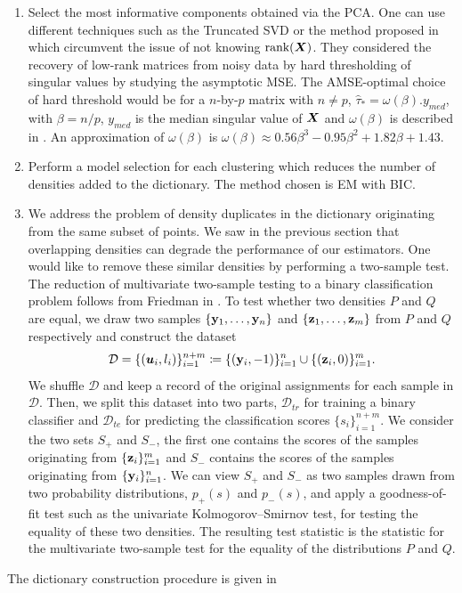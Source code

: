 \begin{enumerate}
  \item Select the most informative components obtained via the PCA. One can use different techniques such as the Truncated SVD or the method proposed in \citep{Gavish2014} which circumvent the issue of not knowing $\textnormal{rank}(\boldsymbol X)$. They considered the recovery of low-rank matrices from noisy data by hard thresholding of singular values by studying the asymptotic MSE. The AMSE-optimal choice of hard threshold would be for a $n$-by-$p$ matrix with $n\neq p$, $\hat\tau_* = \omega(\beta).y_{med}$, with $\beta = n/p$, $y_{med}$ is the median singular value of $\boldsymbol X$ and $\omega(\beta)$ is described in \citep{Gavish2014}. An approximation of $\omega(\beta)$ is $\omega(\beta) \approx 0.56\beta^3 - 0.95\beta^2 + 1.82\beta + 1.43$. 
  \item Perform a model selection for each clustering which reduces the number of densities added to the dictionary. The method chosen is EM with BIC. 
  \item We address the problem of density duplicates in the dictionary originating from the same subset of points. We saw in the previous section that overlapping densities can degrade the performance of our estimators. One would like to remove these similar densities by performing a two-sample test. The reduction of multivariate two-sample testing to a binary classification problem follows from Friedman in \citep{Friedman:2003id}. To test whether two densities $P$ and $Q$ are equal, we draw two samples $\{\mathbf y_1,\dots,\mathbf y_n\}$ and $\{\mathbf z_1,\dots,\mathbf z_m\}$ from $P$ and $Q$ respectively and construct the dataset
\begin{equation}
  \mathcal{D} = \{(\boldsymbol u_i,l_i)\}_{i=1}^{n+m}  \coloneqq  \{(\mathbf y_i,-1)\}_{i=1}^n \cup \{(\mathbf z_i,0)\}_{i=1}^m.
\end{equation}
We shuffle $\mathcal{D}$ and keep a record of the original assignments for each sample in $\mathcal{D}$. Then, we split this dataset into two parts, $\mathcal{D}_{tr}$ for training a binary classifier and $\mathcal{D}_{te}$ for predicting the classification scores $\{s_i\}_{i=1}^{n+m}$. We consider the two sets $S_+$ and $S_-$, the first one contains the scores of the samples originating from $\{\mathbf z_i\}_{i=1}^m$ and $S_-$ contains the scores of the samples originating from $\{\mathbf y_i\}_{i=1}^n$. We can view $S_+$ and $S_-$ as two samples drawn from two probability distributions, $p_+(s)$ and $p_-(s)$, and  apply a goodness-of-fit test such as the univariate Kolmogorov–Smirnov test, for testing the equality of these two densities. The resulting test statistic is the statistic for the multivariate two-sample test for the equality of the distributions $P$ and $Q$. 
\end{enumerate}
The dictionary construction procedure is given in 

